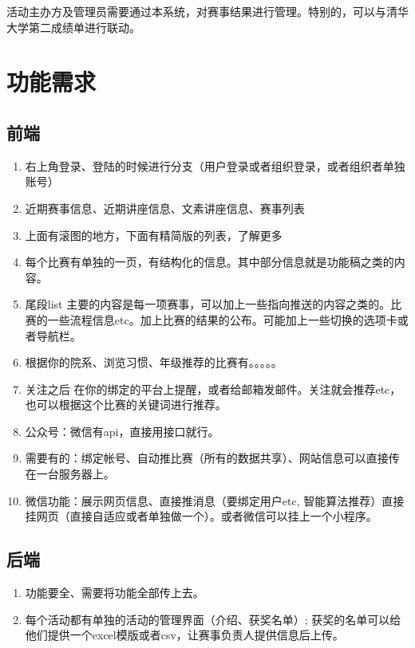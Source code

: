 \documentclass[a4paper,12pt]{article}
\begin{document}
    活动主办方及管理员需要通过本系统，对赛事结果进行管理。特别的，可以与清华大学第二成绩单进行联动。
    \section{功能需求} %
    \label{sec:功能需求}
    \subsection{前端} %
    \label{sub:前端}
    \begin{enumerate}
        \item 右上角登录、登陆的时候进行分支（用户登录或者组织登录，或者组织者单独账号）
        \item 近期赛事信息、近期讲座信息、文素讲座信息、赛事列表
        \item 上面有滚图的地方，下面有精简版的列表，了解更多
        \item 每个比赛有单独的一页，有结构化的信息。其中部分信息就是功能稿之类的内容。
        \item 尾段list 主要的内容是每一项赛事，可以加上一些指向推送的内容之类的。比赛的一些流程信息etc。加上比赛的结果的公布。可能加上一些切换的选项卡或者导航栏。
        \item 根据你的院系、浏览习惯、年级推荐的比赛有。。。。。
        \item 关注之后 在你的绑定的平台上提醒，或者给邮箱发邮件。关注就会推荐etc，也可以根据这个比赛的关键词进行推荐。
        \item 公众号：微信有api，直接用接口就行。
        \item 需要有的：绑定帐号、自动推比赛（所有的数据共享）、网站信息可以直接传在一台服务器上。
        \item 微信功能：展示网页信息、直接推消息（要绑定用户etc, 智能算法推荐）直接挂网页（直接自适应或者单独做一个）。或者微信可以挂上一个小程序。
    \end{enumerate}
    \subsection{后端} %
    \label{sub:后端}
    \begin{enumerate}
        \item 功能要全、需要将功能全部传上去。
        \item 每个活动都有单独的活动的管理界面（介绍、获奖名单）; 获奖的名单可以给他们提供一个excel模版或者csv，让赛事负责人提供信息后上传。
    \end{enumerate}
\end{document}

